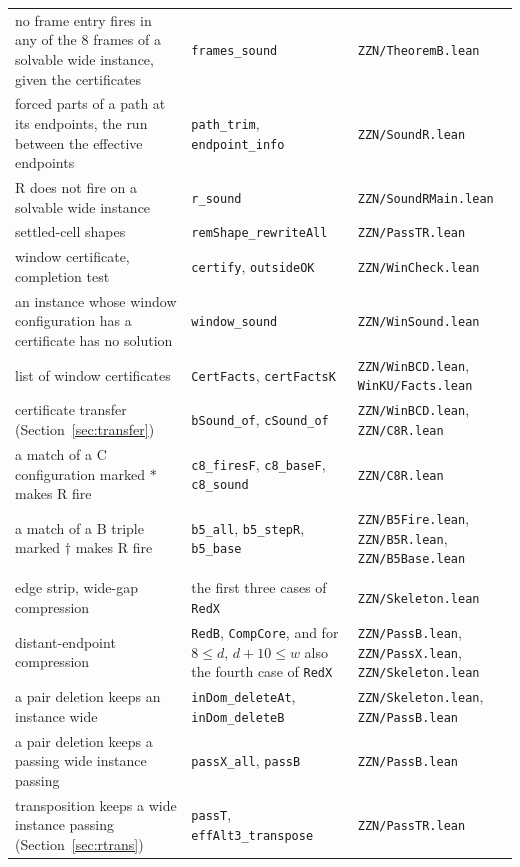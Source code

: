 \documentclass[11pt]{article}
\newcommand{\lean}[1]{\texttt{#1}}
\newcommand{\lf}[1]{\nolinkurl{#1}}
\begin{document}
{\begin{longtable}{@{}>{\raggedright\arraybackslash}p{}>{\raggedright\arraybackslash}p{}>{\raggedright\arraybackslash}p{}@{}}
no frame entry fires in any of the 8 frames of a solvable wide instance, given the certificates & \lean{frames\_sound} & \lf{ZZN/TheoremB.lean} \\
forced parts of a path at its endpoints, the run between the effective endpoints & \lean{path\_trim}, \lean{endpoint\_info} & \lf{ZZN/SoundR.lean} \\
R does not fire on a solvable wide instance & \lean{r\_sound} & \lf{ZZN/SoundRMain.lean} \\
settled-cell shapes & \lean{remShape\_rewriteAll} & \lf{ZZN/PassTR.lean} \\
window certificate, completion test & \lean{certify}, \lean{outsideOK} & \lf{ZZN/WinCheck.lean} \\
an instance whose window configuration has a certificate has no solution & \lean{window\_sound} & \lf{ZZN/WinSound.lean} \\
list of window certificates & \lean{CertFacts}, \lean{certFactsK} & \lf{ZZN/WinBCD.lean}, \lf{WinKU/Facts.lean} \\
certificate transfer (Section~\ref{sec:transfer}) & \lean{bSound\_of}, \lean{cSound\_of} & \lf{ZZN/WinBCD.lean}, \lf{ZZN/C8R.lean} \\
a match of a C configuration marked $*$ makes R fire & \lean{c8\_firesF}, \lean{c8\_baseF}, \lean{c8\_sound} & \lf{ZZN/C8R.lean} \\
a match of a B triple marked $\dagger$ makes R fire & \lean{b5\_all}, \lean{b5\_stepR}, \lean{b5\_base} & \lf{ZZN/B5Fire.lean}, \lf{ZZN/B5R.lean}, \lf{ZZN/B5Base.lean} \\
\multicolumn{3}{@{}l}{\emph{Deleting and inserting free lines (Section 3.3)}} \\
edge strip, wide-gap compression & the first three cases of \lean{RedX} & \lf{ZZN/Skeleton.lean} \\
distant-endpoint compression & \lean{RedB}, \lean{CompCore}, and for $8\le d$, $d+10\le w$ also the fourth case of \lean{RedX} & \lf{ZZN/PassB.lean}, \lf{ZZN/PassX.lean}, \lf{ZZN/Skeleton.lean} \\
a pair deletion keeps an instance wide & \lean{inDom\_deleteAt}, \lean{inDom\_deleteB} & \lf{ZZN/Skeleton.lean}, \lf{ZZN/PassB.lean} \\
a pair deletion keeps a passing wide instance passing & \lean{passX\_all}, \lean{passB} & \lf{ZZN/PassB.lean} \\
transposition keeps a wide instance passing (Section~\ref{sec:rtrans}) & \lean{passT}, \lean{effAlt3\_transpose} & \lf{ZZN/PassTR.lean} \\

\end{longtable}}
\end{document}
